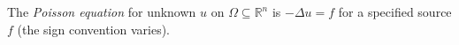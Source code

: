 
The \emph{Poisson equation} for unknown $u$ on $\Omega\subseteq\mathbb R^n$ is $-\Delta u=f$ for a specified source $f$ (the sign convention varies).
